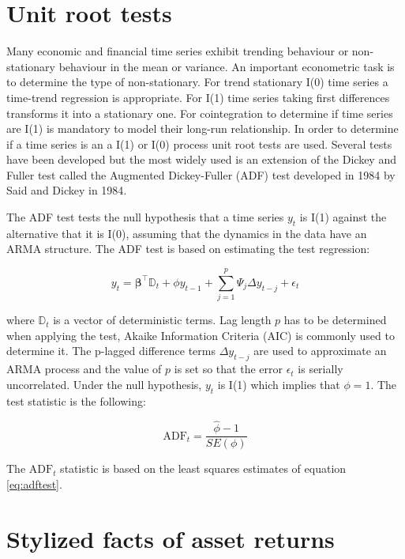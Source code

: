 \section{Unit root tests}

Many economic and financial time series exhibit trending behaviour or non-stationary behaviour in the mean or variance. An important econometric task is to determine the type of non-stationary. For trend stationary I(0) time series a time-trend regression is appropriate. For I(1) time series taking first differences transforms it into a stationary one.  For cointegration to determine if time series are I(1) is mandatory to model their long-run relationship. In order to determine if a time series is an a I(1) or I(0) process unit root tests are used. Several tests have been developed but the most widely used is an extension of the Dickey and Fuller test \cite{dickey1979} called the Augmented Dickey-Fuller (ADF) test developed in 1984 by Said and Dickey in 1984\cite{said1984}.

The ADF test tests the null hypothesis that a time series $y_t$ is I(1) against the alternative that it is I(0), assuming that the dynamics in the data have an ARMA structure. The ADF test is based on estimating the test regression:

\begin{equation}
\label{eq:adftest}
y_t = \boldsymbol{\beta}^\top \mathbb{D}_t + \phi y_{t-1} + \sum_{j=1}^p \Psi_j \Delta y_{t-j} + \epsilon_t
\end{equation}

\noindent where $\mathbb{D}_t$ is a vector of deterministic terms. Lag length $p$ has to be determined when applying the test, Akaike Information Criteria (AIC) is commonly used to determine it.
The p-lagged difference terms $\Delta y_{t-j}$ are used to approximate an ARMA process and the value of $p$ is set so that the error $\epsilon_t$ is serially uncorrelated. 
Under the null hypothesis, $y_t$ is I(1) which implies that $\phi=1$. 
The test statistic is the following:

\[
\text{ADF}_t = \frac{\hat{\phi} -1}{SE(\phi)}
\]

The $\text{ADF}_t$ statistic is based on the least squares estimates of equation \ref{eq:adftest}.

\section{Stylized facts of asset returns}
\label{sec:stylizedfacts}

